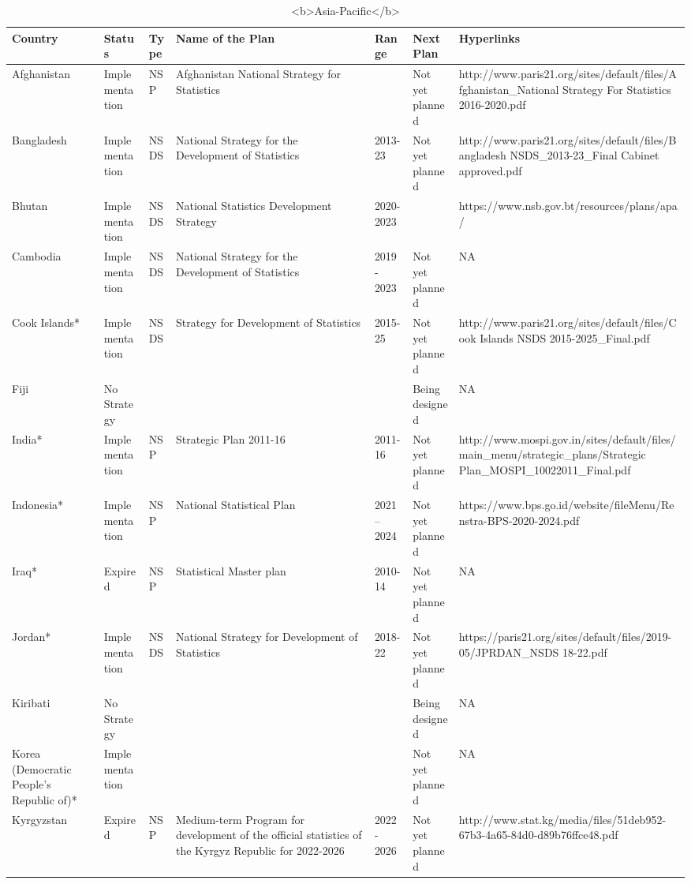 \documentclass[
]{article}
\begin{document}
\begin{table}

\caption{\label{tab:unnamed-chunk-4}<b>Asia-Pacific</b>}
\centering
\begin{tabular}[t]{lllllll}
\toprule
Country & Status & Type & Name of the Plan & Range & Next Plan & Hyperlinks\\
\midrule
Afghanistan & Implementation & NSP & Afghanistan National Strategy for Statistics &  & Not yet planned & http://www.paris21.org/sites/default/files/Afghanistan\_National Strategy For Statistics 2016-2020.pdf\\
Bangladesh & Implementation & NSDS & National Strategy for the Development of Statistics & 2013-23 & Not yet planned & http://www.paris21.org/sites/default/files/Bangladesh NSDS\_2013-23\_Final Cabinet approved.pdf\\
Bhutan & Implementation & NSDS & National Statistics Development Strategy & 2020-2023 &  & https://www.nsb.gov.bt/resources/plans/apa/\\
Cambodia & Implementation & NSDS & National Strategy for the Development of Statistics & 2019 - 2023 & Not yet planned & NA\\
Cook Islands* & Implementation & NSDS & Strategy for Development of Statistics & 2015-25 & Not yet planned & http://www.paris21.org/sites/default/files/Cook Islands NSDS 2015-2025\_Final.pdf\\
\addlinespace
Fiji & No Strategy &  &  &  & Being designed & NA\\
India* & Implementation & NSP & Strategic Plan 2011-16 & 2011-16 & Not yet planned & http://www.mospi.gov.in/sites/default/files/main\_menu/strategic\_plans/Strategic Plan\_MOSPI\_10022011\_Final.pdf\\
Indonesia* & Implementation & NSP & National Statistical Plan & 2021 – 2024 & Not yet planned & https://www.bps.go.id/website/fileMenu/Renstra-BPS-2020-2024.pdf\\
Iraq* & Expired & NSP & Statistical Master plan & 2010-14 & Not yet planned & NA\\
Jordan* & Implementation & NSDS & National Strategy for Development of Statistics & 2018-22 & Not yet planned & https://paris21.org/sites/default/files/2019-05/JPRDAN\_NSDS 18-22.pdf\\
\addlinespace
Kiribati & No Strategy &  &  &  & Being designed & NA\\
Korea (Democratic People's Republic of)* & Implementation &  &  &  & Not yet planned & NA\\
Kyrgyzstan & Expired & NSP & Medium-term Program for development of the official statistics of the Kyrgyz Republic for 2022-2026 & 2022 - 2026 & Not yet planned & http://www.stat.kg/media/files/51deb952-67b3-4a65-84d0-d89b76ffce48.pdf\\

\end{tabular}
\end{table}
\end{document}
